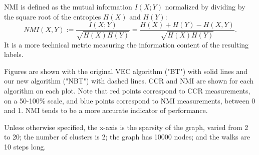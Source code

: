 \documentclass{article} %
\begin{document}
NMI is defined as the mutual information $I(X;Y)$ normalized by dividing by the square root of the entropies $H(X)$ and $H(Y)$:
$$NMI(X,Y) := \frac{I(X;Y)}{\sqrt{H(X)H(Y)}} = \frac{H(X)+H(Y)-H(X,Y)}{\sqrt{H(X)H(Y)}}.$$
It is a more technical metric measuring the information content of the resulting labels.

Figures are shown with the original VEC algorithm ("BT") with solid lines and our new algorithm ("NBT") with dashed lines. CCR and NMI are shown for each algorithm on each plot. Note that red points correspond to CCR measurements, on a 50-100\% scale, and blue points correspond to NMI measurements, between 0 and 1. NMI tends to be a more accurate indicator of performance.

Unless otherwise specified, the x-axis is the sparsity of the graph, varied from 2 to 20; the number of clusters is 2; the graph has 10000 nodes; and the walks are 10 steps long.
\end{document}
